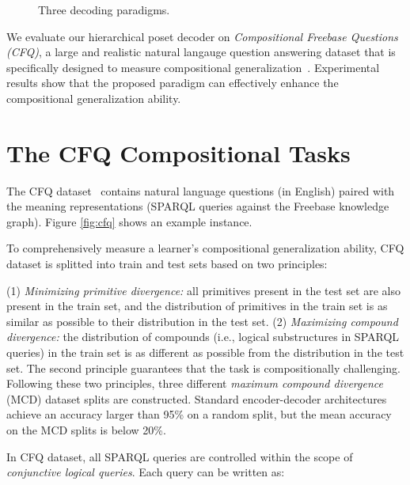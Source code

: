\documentclass{article}
\begin{document}
\begin{figure}
\centering
\small
{}
\caption{Three decoding paradigms. }
\label{fig:paradigms}
\end{figure}

We evaluate our hierarchical poset decoder on \emph{Compositional Freebase Questions (CFQ)}, a large and realistic natural langauge question answering dataset that is specifically designed to measure compositional generalization~\citep{keysers2020measuring}.
Experimental results show that the proposed paradigm can effectively enhance the compositional generalization ability.


\section{The CFQ Compositional Tasks}
\label{sec:cfq}

The CFQ dataset~\citep{keysers2020measuring} contains natural language questions (in English) paired with the meaning representations (SPARQL queries against the Freebase knowledge graph).
Figure \ref{fig:cfq} shows an example instance.

To comprehensively measure a learner's compositional generalization ability, CFQ dataset is splitted into train and test sets based on two principles:

(1) \emph{Minimizing primitive divergence:}
all primitives present in the test set are also present in the train set, and the distribution of primitives in the train set is as similar as possible to their distribution in the test set.
(2) \emph{Maximizing compound divergence:}
the distribution of compounds (i.e., logical substructures in SPARQL queries) in the train set is as different as possible from the distribution in the test set.
The second principle guarantees that the task is compositionally challenging.
Following these two principles, three different \emph{maximum compound divergence} (MCD) dataset splits are constructed.
Standard encoder-decoder architectures achieve an accuracy larger than 95\% on a random split, but the mean accuracy on the MCD splits is below 20\%.

In CFQ dataset, all SPARQL queries are controlled within the scope of \emph{conjunctive logical queries}.
Each query  can be written as:
\end{document}
